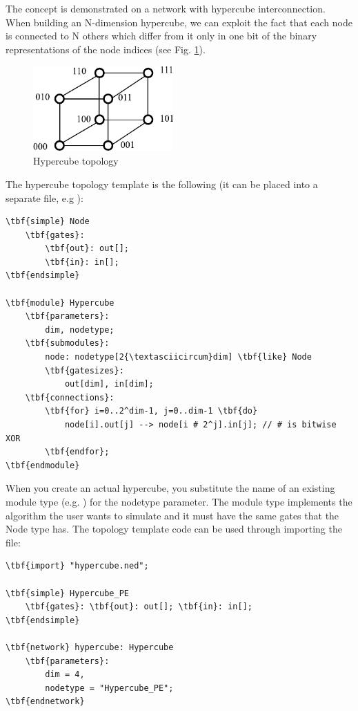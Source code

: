 The concept is demonstrated on a network with hypercube interconnection.
When building an N-dimension hypercube, we can exploit the fact
that each node is connected to N others which differ from it
only in one bit of the binary representations of the node indices
(see Fig. \ref{fig:ch-ned-lang:hypercube-topology}).

\begin{figure}[htbp]
  \begin{center}
    \includegraphics[width=2.111in, height=1.285in]{figures/usmanFig8}
    \caption{Hypercube topology}
    \label{fig:ch-ned-lang:hypercube-topology}
  \end{center}
\end{figure}


The hypercube topology template is the
following (it can be placed into a separate file, e.g ):


\begin{Verbatim}[commandchars=\\\{\}]
\tbf{simple} Node
    \tbf{gates}:
        \tbf{out}: out[];
        \tbf{in}: in[];
\tbf{endsimple}

\tbf{module} Hypercube
    \tbf{parameters}:
        dim, nodetype;
    \tbf{submodules}:
        node: nodetype[2{\textasciicircum}dim] \tbf{like} Node
        \tbf{gatesizes}:
            out[dim], in[dim];
    \tbf{connections}:
        \tbf{for} i=0..2^dim-1, j=0..dim-1 \tbf{do}
            node[i].out[j] --> node[i # 2^j].in[j]; // # is bitwise XOR
        \tbf{endfor};
\tbf{endmodule}
\end{Verbatim}



When you create an actual hypercube, you substitute the name
of an existing module type (e.g. ) for the nodetype
parameter. The module type implements the algorithm the user
wants to simulate and it must have the same gates that the Node
type has. The topology template code can be used through importing
the file:


\begin{Verbatim}[commandchars=\\\{\}]
\tbf{import} "hypercube.ned";

\tbf{simple} Hypercube_PE
    \tbf{gates}: \tbf{out}: out[]; \tbf{in}: in[];
\tbf{endsimple}

\tbf{network} hypercube: Hypercube
    \tbf{parameters}:
        dim = 4,
        nodetype = "Hypercube_PE";
\tbf{endnetwork}
\end{Verbatim}




